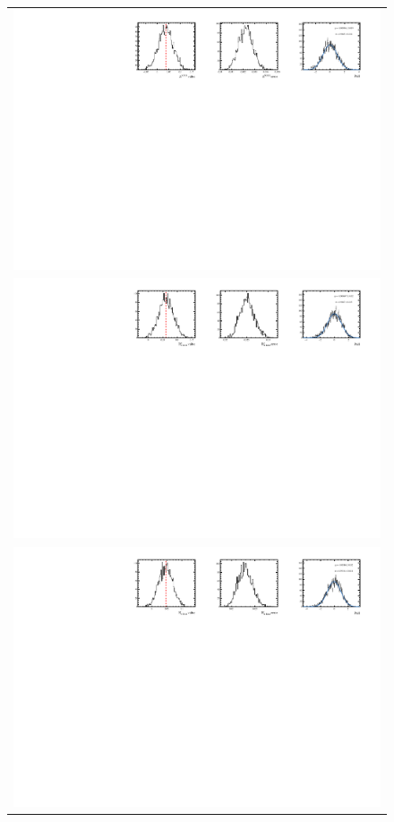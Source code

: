 \begin{figure}
  \centering
  \begin{tabular}{c}
\includegraphics[width=\textwidth]{ANA_resources/Plots/Data_fit/FitterBias//A_signal_Kpipipi.pdf} \\
\includegraphics[width=\textwidth]{ANA_resources/Plots/Data_fit/FitterBias//R_signal_piKpipi_plus.pdf} \\
\includegraphics[width=\textwidth]{ANA_resources/Plots/Data_fit/FitterBias//R_signal_piKpipi_minus.pdf} \\

\end{tabular}
\end{figure}

